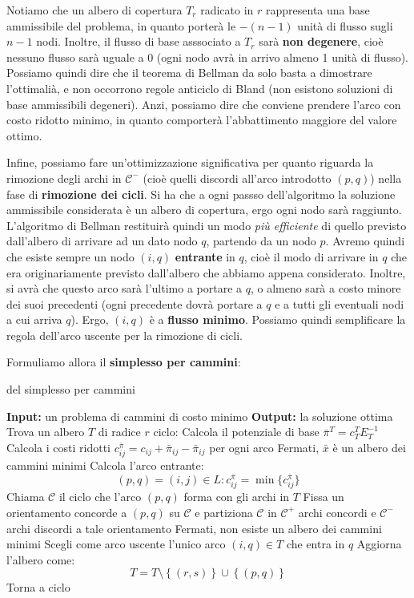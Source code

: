 \documentclass[a4paper,11pt]{article}
\begin{document}
Notiamo che un albero di copertura $T_r$ radicato in $r$ rappresenta una base ammissibile del problema, in quanto porterà le $-(n-1)$ unità di flusso sugli $n-1$ nodi.
Inoltre, il flusso di base asssociato a $T_r$ sarà \textbf{non degenere}, cioè nessuno flusso sarà uguale a 0 (ogni nodo avrà in arrivo almeno 1 unità di flusso).
Possiamo quindi dire che il teorema di Bellman da solo basta a dimostrare l'ottimalià, e non occorrono regole anticiclo di Bland (non esistono soluzioni di base ammissibili degeneri).
Anzi, possiamo dire che conviene prendere l'arco con costo ridotto minimo, in quanto comporterà l'abbattimento maggiore del valore ottimo.

Infine, possiamo fare un'ottimizzazione significativa per quanto riguarda la rimozione degli archi in $\mathcal{C}^-$ (cioè quelli discordi all'arco introdotto $(p,q)$) nella fase di \textbf{rimozione dei cicli}.
Si ha che a ogni passso dell'algoritmo la soluzione ammissibile considerata è un albero di copertura, ergo ogni nodo sarà raggiunto.
L'algoritmo di Bellman restituirà quindi un modo \textit{più efficiente} di quello previsto dall'albero di arrivare ad un dato nodo $q$, partendo da un nodo $p$.
Avremo quindi che esiste sempre un nodo $(i,q)$ \textbf{entrante} in $q$, cioè il modo di arrivare in $q$ che era originariamente previsto dall'albero che abbiamo appena considerato.
Inoltre, si avrà che questo arco sarà l'ultimo a portare a $q$, o almeno sarà a costo minore dei suoi precedenti (ogni precedente dovrà portare a $q$ e a tutti gli eventuali nodi a cui arriva $q$).
Ergo, $(i, q)$ è a \textbf{flusso minimo}.
Possiamo quindi semplificare la regola dell'arco uscente per la rimozione di cicli.

Formuliamo allora il \textbf{simplesso per cammini}:
\begin{algorithm}[H]
\caption{del simplesso per cammini}
\begin{algorithmic}
	\STATE \textbf{Input:} un problema di cammini di costo minimo 
	\STATE \textbf{Output:} la soluzione ottima 
	\STATE Trova un albero $T$ di radice $r$ 
	\STATE \textsf{ciclo:}
	\STATE Calcola il potenziale di base $\bar{\pi}^T = c_T^T E_T^{-1}$
	\STATE Calcola i costi ridotti $c_{ij}^{\bar{\pi}} = c_{ij} + \bar{\pi}_{ij} - \bar{\pi}_{ij}$ per ogni arco
	\STATE Fermati, $\bar{x}$ è un albero dei cammini minimi 
\ELSE
		\STATE Calcola l'arco entrante: 
		$$
		(p, q) = (i, j) \in L : c_{ij}^{\bar{\pi}} = \min \{ c_{ij}^{\bar{\pi}} \} 
		$$
		\STATE Chiama $\mathcal{C}$ il ciclo che l'arco $(p, q)$ forma con gli archi in $T$
		\STATE Fissa un orientamento concorde a $(p,q)$ su $\mathcal{C}$ e partiziona $\mathcal{C}$ in $\mathcal{C^+}$ archi concordi e $\mathcal{C^-}$ archi discordi a tale orientamento
	\ENDIF
		\STATE Fermati, non esiste un albero dei cammini minimi 
	\ELSE
		\STATE Scegli come arco uscente l'unico arco $(i, q) \in T$ che entra in $q$ 
	\ENDIF
	\STATE Aggiorna l'albero come:
	$$
	T = T \setminus \left\{ (r,s) \right\} \cup \left\{ (p, q) \right\} 
	$$
	\STATE Torna a \textsf{ciclo}
\end{algorithmic}
\end{algorithm}
\end{document}
